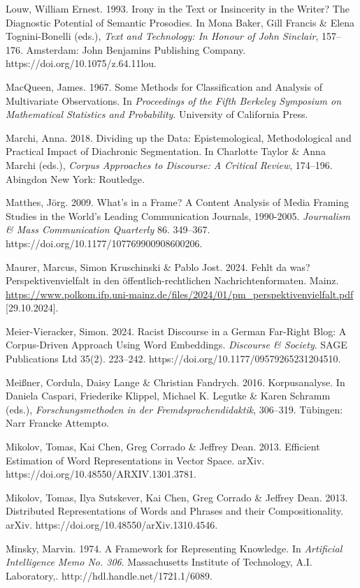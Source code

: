 Louw, William Ernest. 1993. Irony in the Text or Insincerity in the Writer? The Diagnostic Potential of Semantic Prosodies. In Mona Baker, Gill Francis \& Elena Tognini-Bonelli (eds.), \emph{Text and Technology: In Honour of John Sinclair}, 157--176. Amsterdam: John Benjamins Publishing Company. https://doi.org/10.1075/z.64.11lou.

MacQueen, James. 1967. Some Methods for Classification and Analysis of Multivariate Observations. In \emph{Proceedings of the Fifth Berkeley Symposium on Mathematical Statistics and Probability}. University of California Press.

Marchi, Anna. 2018. Dividing up the Data: Epistemological, Methodological and Practical Impact of Diachronic Segmentation. In Charlotte Taylor \& Anna Marchi (eds.), \emph{Corpus Approaches to Discourse: A Critical Review}, 174--196. Abingdon New York: Routledge.

Matthes, Jörg. 2009. What's in a Frame? A Content Analysis of Media Framing Studies in the World's Leading Communication Journals, 1990-2005. \emph{Journalism \& Mass Communication Quarterly} 86. 349--367. https://doi.org/10.1177/107769900908600206.

Maurer, Marcus, Simon Kruschinski \& Pablo Jost. 2024. Fehlt da was? Perspektivenvielfalt in den öffentlich-rechtlichen Nachrichtenformaten. Mainz. \url{https://www.polkom.ifp.uni-mainz.de/files/2024/01/pm_perspektivenvielfalt.pdf} {[}29.10.2024{]}.

Meier-Vieracker, Simon. 2024. Racist Discourse in a German Far-Right Blog: A Corpus-Driven Approach Using Word Embeddings. \emph{Discourse \& Society}. SAGE Publications Ltd 35(2). 223--242. https://doi.org/10.1177/09579265231204510.

Meißner, Cordula, Daisy Lange \& Christian Fandrych. 2016. Korpusanalyse. In Daniela Caspari, Friederike Klippel, Michael K. Legutke \& Karen Schramm (eds.), \emph{Forschungsmethoden in der Fremdsprachendidaktik}, 306--319. Tübingen: Narr Francke Attempto.

Mikolov, Tomas, Kai Chen, Greg Corrado \& Jeffrey Dean. 2013. Efficient Estimation of Word Representations in Vector Space. arXiv. https://doi.org/10.48550/ARXIV.1301.3781.

Mikolov, Tomas, Ilya Sutskever, Kai Chen, Greg Corrado \& Jeffrey Dean. 2013. Distributed Representations of Words and Phrases and their Compositionality. arXiv. https://doi.org/10.48550/arXiv.1310.4546.

Minsky, Marvin. 1974. A Framework for Representing Knowledge. In \emph{Artificial Intelligence Memo No. 306}. Massachusetts Institute of Technology, A.I. Laboratory,. http://hdl.handle.net/1721.1/6089.

